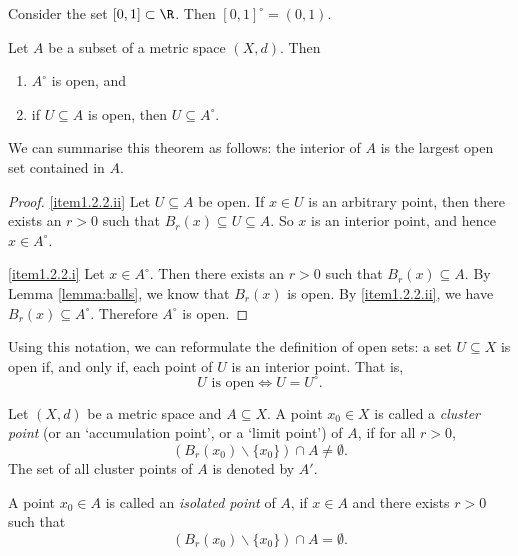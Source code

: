 \begin{example}
Consider the set $[0,1] \subset \R$. Then $[0,1]^\circ = (0,1)$.
\end{example}


\begin{theorem} \label{thm:interior}
Let $A$ be a subset of a metric space $(X,d)$. Then
\begin{enumerate}
\item \label{item1.2.2.i} $A^\circ$ is open, and
\item \label{item1.2.2.ii} if $U \subseteq A$ is open, then $U \subseteq A^\circ$.
\end{enumerate}
\end{theorem}

We can summarise this theorem as follows: the interior of $A$ is the largest
open set contained in $A$.

\np

\begin{proof}
\eqref{item1.2.2.ii} Let $U \subseteq A$ be open. If $x \in U$ is an
arbitrary point, then there exists an $r > 0$ such that $B_r(x) \subseteq U \subseteq A$.
So $x$ is an interior point, and hence $x \in A^\circ$.

\eqref{item1.2.2.i} Let $x \in A^\circ$. Then there exists an $r > 0$ such that
$B_r(x) \subseteq A$. By Lemma \ref{lemma:balls}, we know that $B_r(x)$ is open.
By \eqref{item1.2.2.ii}, we have $B_r(x) \subseteq A^\circ$. Therefore $A^\circ$ is open.
\end{proof}


\begin{remark}
Using this notation, we can reformulate the definition of open sets: a set
$U \subseteq X$ is open if, and only if, each point of $U$ is an interior point.
That is,
\[
U \mbox{ is open} \Leftrightarrow U = U^\circ.
\]
\end{remark}





\np

\begin{definition}
Let $(X,d)$ be a metric space and $A \subseteq X$. A point $x_0 \in X$ is
called a \emph{cluster point} (or an `accumulation point', or a `limit point') of $A$, if for all
$r > 0$,
\[
(B_r(x_0) \backslash \{x_0\}) \cap A \not= \emptyset.
\]
The set of all cluster points of $A$ is denoted by $A'$.


A point $x_0 \in A$ is called an \emph{isolated point} of $A$, if $x\in A$ and there exists $r > 0$ such that
\[
(B_r(x_0) \backslash \{x_0\}) \cap A  = \emptyset.
\]

\end{definition}

